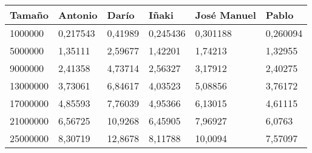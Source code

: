 \begin{tabular}{|l|l|l|l|l|l|}
	\hline
	Tamaño & Antonio & Darío & Iñaki & José Manuel & Pablo \\
	\hline
	\hline
	1000000 & 0,217543 & 0,41989 & 0,245436 & 0,301188 & 0,260094 \\
	\hline
	5000000 & 1,35111 & 2,59677 & 1,42201 & 1,74213 & 1,32955 \\
	\hline
	9000000 & 2,41358 & 4,73714 & 2,56327 & 3,17912 & 2,40275 \\
	\hline
	13000000 & 3,73061 & 6,84617 & 4,03523 & 5,08856 & 3,76172 \\
	\hline
	17000000 & 4,85593 & 7,76039 & 4,95366 & 6,13015 & 4,61115 \\
	\hline
	21000000 & 6,56725 & 10,9268 & 6,45905 & 7,96927 & 6,0763 \\
	\hline
	25000000 & 8,30719 & 12,8678 & 8,11788 & 10,0094 & 7,57097 \\
	\hline
\end{tabular}
